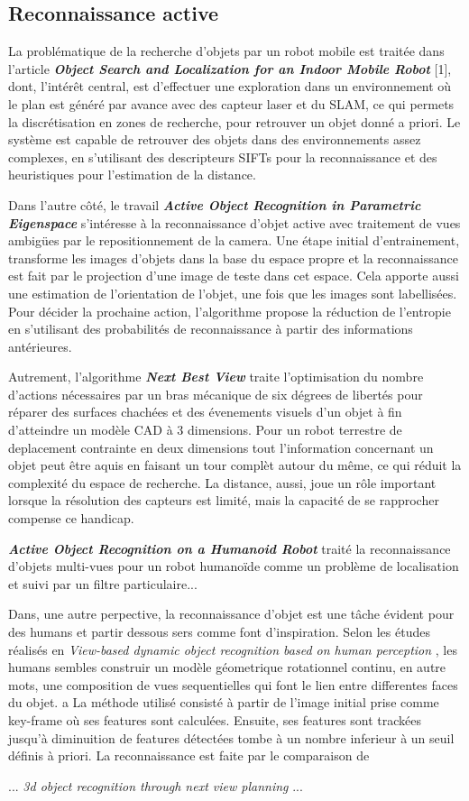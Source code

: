 \subsection{Reconnaissance active}
La problématique de la recherche d'objets par un robot mobile est traitée dans l'article \textbf{\textit{Object Search and Localization for an Indoor Mobile Robot}} [1], dont, l'intérêt central, est d'effectuer une exploration dans un environnement où le plan est généré par avance avec des capteur laser et du SLAM, ce qui permets la discrétisation en zones de recherche, pour retrouver un objet donné a priori. Le système est capable de retrouver des objets dans des environnements assez complexes, en s'utilisant des descripteurs SIFTs pour la reconnaissance et des heuristiques pour l'estimation de la distance. 

Dans l'autre côté, le travail \textbf{\textit{Active Object Recognition in Parametric Eigenspace}} s'intéresse à la reconnaissance d'objet active avec traitement de vues ambigües par le repositionnement de la camera. Une étape initial d'entrainement, transforme les images d'objets dans la base du espace propre et la reconnaissance est fait par le projection d'une image de teste dans cet espace. Cela apporte aussi une estimation de l'orientation de l'objet, une fois que les images sont labellisées. Pour décider la prochaine action, l'algorithme propose la réduction de l'entropie en s'utilisant des probabilités de reconnaissance à partir des informations antérieures.

Autrement, l'algorithme \textbf{\textit{Next Best View}} traite l'optimisation du nombre d'actions nécessaires par un bras mécanique de six dégrees de libertés pour réparer des surfaces chachées et des évenements visuels d'un objet à fin d'atteindre un modèle CAD à 3 dimensions. Pour un robot terrestre de deplacement contrainte en deux dimensions tout l'information concernant un objet peut être aquis en faisant un tour complèt autour du même, ce qui réduit la complexité du espace de recherche. La distance, aussi, joue un rôle important lorsque la résolution des capteurs est limité, mais la capacité de se rapprocher compense ce handicap.


{\color{green}	\textbf{\textit{Active Object Recognition on a Humanoid Robot}} traité la reconnaissance d'objets multi-vues pour un robot humanoïde comme un problème de localisation et suivi par un filtre particulaire... 

  Dans, une autre perpective, la reconnaissance d'objet est une tâche évident pour des humans et partir dessous sers comme font d'inspiration. Selon les études réalisés en \textit{ View-based dynamic object recognition based on human perception }, les humans sembles construir un modèle géometrique rotationnel continu, en autre mots, une composition de vues sequentielles qui font le lien entre differentes faces du objet. a La méthode utilisé consisté à partir de l'image initial prise comme key-frame où ses features sont calculées. Ensuite, ses features sont trackées jusqu'à diminuition de features détectées tombe à un nombre inferieur à un seuil définis à priori. La reconnaissance est faite par le comparaison de 

  ... \textit{3d object recognition through next view planning} ...
} 

